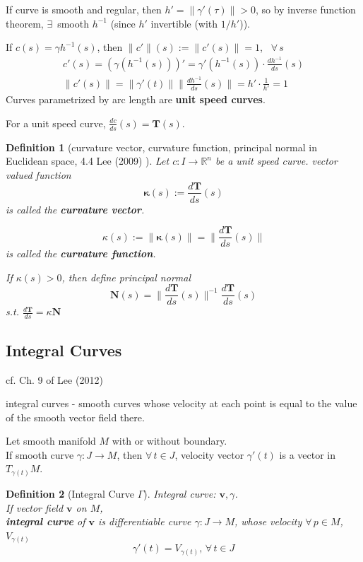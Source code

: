 \documentclass[10pt]{amsart}
\newtheorem{definition}{Definition}
\begin{document}
\begin{multicols*}{2}
If curve is smooth and regular, then $h'= \| \gamma'(\tau) \| >0$, so by inverse function theorem, $\exists \,$ smooth $h^{-1}$ (since $h'$ invertible (with $1/h'$)). 

If $c(s) = \gamma h^{-1}(s)$, then $\| c' \|(s) := \| c'(s)\| = 1$, \, $\forall \, s$
\[
\begin{gathered} 
c'(s) = (\gamma(h^{-1}(s)))' = \gamma'(h^{-1}(s)) \cdot \frac{dh^{-1}}{ds}(s) \\
\| c'(s) \| = \| \gamma'(t) \| \| \frac{dh^{-1}}{ds} (s) \| = h' \cdot \frac{1}{h'} = 1
\end{gathered} 
\]
Curves parametrized by arc length are \textbf{unit speed curves}.


For a unit speed curve, $\frac{dc}{ds}(s) = \mathbf{T}(s)$. 

\begin{definition}[curvature vector, curvature function, principal normal in Euclidean space, 4.4 Lee (2009) \cite{JLee2009}]
	Let $c:I \to \mathbb{R}^n$ be a unit speed curve. vector valued function
	\[
	\mathbf{\kappa}(s) := \frac{d\mathbf{T}}{ds}(s) 
	\]
	is called the \textbf{curvature vector}.
	
	\[
	\kappa(s) := \| \mathbf{\kappa}(s) \| = \| \frac{d\mathbf{T}}{ds}(s) \|
	\]
	is called the \textbf{curvature function}.

	If $\kappa(s) >0$, then define principal normal
	\[
	\mathbf{N}(s) = \| \frac{d\mathbf{T}}{ds}(s) \|^{-1} \frac{d\mathbf{T}}{ds}(s) 
	\]
	s.t. $\frac{d\mathbf{T}}{ds} = \kappa \mathbf{N}$
\end{definition}

\subsection{Integral Curves}

cf. Ch. 9 of Lee (2012) \cite{JLee2012}

integral curves - smooth curves whose velocity at each point is equal to the value of the smooth vector field there. 

Let smooth manifold $M$ with or without boundary. \\
If smooth curve $\gamma : J \to M$, then $\forall \, t \in J$, velocity vector $\gamma'(t)$ is a vector in $T_{\gamma(t)}M$.  \\

\begin{definition}[Integral Curve $\Gamma$]
Integral curve: $\mathbf{v}, \gamma$. \\
If vector field $\mathbf{v}$ on $M$, \\
\textbf{integral curve} of $\mathbf{v}$ is differentiable curve $\gamma : J \to M$, whose velocity $\forall \, p \in M$, $V_{\gamma(t)}$
\[
\gamma'(t) = V_{\gamma(t)}, \, \forall \, t \in J
\]
\end{definition}


\end{multicols*}
\end{document}
